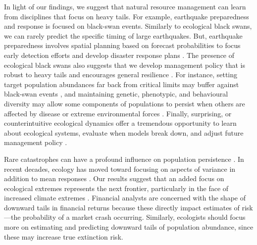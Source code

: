 \documentclass[9pt,twocolumn,twoside]{pnas-new}
\begin{document}
In light of our findings, we suggest that natural resource management can
learn from disciplines that focus on heavy tails. For example, earthquake
preparedness and response is focused on black-swan events. Similarly to
ecological black swans, we can rarely predict the specific timing of large
earthquakes. But, earthquake preparedness involves spatial planning based on
forecast probabilities to focus early detection efforts and develop disaster
response plans \cite{nrc2007}. The presence of ecological black swans also suggests that we
develop management policy that is robust to heavy tails and encourages
general resilience \cite{carpenter2012}. For instance, setting target
population abundances far back from critical limits may buffer against black-swan
events \cite{caddy1996}, and maintaining genetic, phenotypic, and behavioural
diversity may allow some components of populations to persist when others are
affected by disease or extreme environmental forces \cite{schindler2010}.
Finally, surprising, or counterintuitive ecological dynamics offer a tremendous
opportunity to learn about ecological systems, evaluate when models break down,
and adjust future management policy \cite{doak2008, lindenmayer2010}.

Rare catastrophes can have a profound influence on population
persistence \cite{mangel1994}. In recent decades, ecology has moved toward
focusing on aspects of variance in addition to mean
responses \cite{thompson2013}. Our results suggest that an added focus on
ecological extremes represents the next frontier, particularly in the face of
increased climate extremes \cite{meehl2004, ipcc2012, thompson2013}. Financial
analysts are concerned with the shape of downward tails in financial returns
because these directly impact estimates of risk---the probability of a
market crash occurring.
Similarly, ecologists should focus more
on estimating and predicting downward tails of population abundance, since
these may increase true extinction risk.
\end{document}
